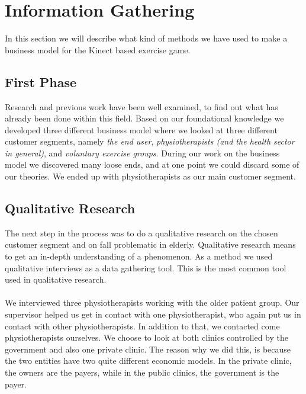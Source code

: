 \chapter{Information Gathering}

In this section we will describe what kind of methods we have used to make a business model for the Kinect based exercise game. 

\section{First Phase}
Research and previous work have been well examined, to find out what has already been done within this field. Based on our foundational knowledge we developed three different business model where we looked at three different customer segments, namely \emph{the end user}, \emph{physiotherapists (and the health sector in general)}, and \emph{voluntary exercise groups}. During our work on the business model we discovered many loose ends, and at one point we could discard some of our theories. We ended up with physiotherapists as our main customer segment.

\section{Qualitative Research}
The next step in the process was to do a qualitative research on the chosen customer segment and on fall problematic in elderly. Qualitative research means to get an in-depth understanding of a phenomenon. As a method we used qualitative interviews as a data gathering tool. This is the most common tool used in qualitative research.  \cite{interview2} \\ \\
We interviewed three physiotherapists working with the older patient group. Our supervisor helped us get in contact with one physiotherapist, who again put us in contact with other physiotherapists. In addition to that, we contacted come physiotherapists ourselves. We choose to look at both clinics controlled by the government and also one private clinic. The reason why we did this, is because the two entities have two quite different economic models. In the private clinic, the owners are the payers, while in the public clinics, the government is the payer.

